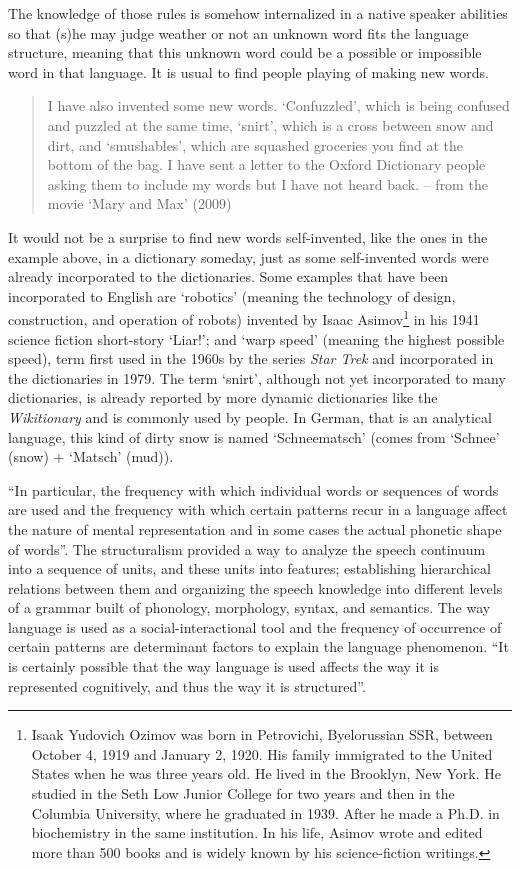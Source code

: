 The knowledge of those rules is somehow internalized in a native speaker abilities so that (s)he may judge weather or not an unknown word fits the language structure, meaning that this unknown word could be a possible or impossible word in that language. It is usual to find people playing of making new words. 
\begin{quote}
I have also invented some new words. `Confuzzled', which is being confused and puzzled at the same time, `snirt', which is a cross between snow and dirt, and `smushables', which are squashed groceries you find at the bottom of the bag. I have sent a letter to the Oxford Dictionary people asking them to include my words but I have not heard back. -- from the movie `Mary and Max' (2009) 
\end{quote}
It would not be a surprise to find new words self-invented, like the ones in the example above, in a dictionary someday, just as some self-invented words were already incorporated to the dictionaries. Some examples that have been incorporated to English are `robotics' (meaning the technology of design, construction, and operation of robots) invented by Isaac Asimov\footnote{Isaak Yudovich Ozimov was born in Petrovichi, Byelorussian SSR, between October 4, 1919 and January 2, 1920. His family immigrated to the United States when he was three years old. He lived in the Brooklyn, New York. He studied in the Seth Low Junior College for two years and then in the Columbia University, where he graduated in 1939. After he made a Ph.D. in biochemistry in the same institution. In his life, Asimov wrote and edited more than 500 books and is widely known by his science-fiction writings.} in his 1941 science fiction short-story `Liar!'; and `warp speed' (meaning the highest possible speed), term first used in the 1960s by the series \textit{Star Trek} and incorporated in the dictionaries in 1979. The term `snirt', although not yet incorporated to many dictionaries, is already reported by more dynamic dictionaries like the \textit{Wikitionary} and is commonly used by people. In German, that is an analytical language, this kind of dirty snow is named `Schneematsch' (comes from `Schnee' (snow) + `Matsch' (mud)).
 
``In particular, the frequency with which individual words or sequences of words are used and the frequency with which certain patterns recur in a language affect the nature of mental representation and in some cases the actual phonetic shape of words''\citep{bybee2003}. The structuralism provided a way to analyze the speech continuum into a sequence of units, and these units into features; establishing hierarchical relations between them and organizing the speech knowledge into different levels of a grammar built of phonology, morphology, syntax, and semantics. The way language is used as a social-interactional tool and the frequency of occurrence of certain patterns are determinant factors to explain the language phenomenon. ``It is certainly possible that the way language is used affects the way it is represented cognitively, and thus the way it is structured''\citep{bybee2003}.

